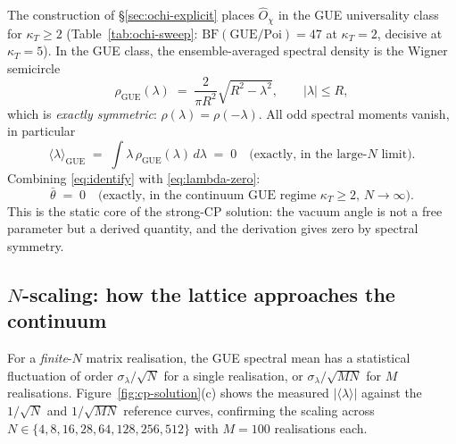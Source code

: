\documentclass[11pt,a4paper]{article}
\newcommand{\Opchi}{\hat{O}_\chi}
\theoremstyle{plain}
\theoremstyle{definition}
\theoremstyle{remark}
\begin{document}
{\sloppy
The construction of \S\ref{sec:ochi-explicit} places $\Opchi$ in
the GUE universality class for $\kappa_T \ge 2$
(Table~\ref{tab:ochi-sweep}: $\mathrm{BF}(\mathrm{GUE}/\mathrm{Poi})
= 47$ at $\kappa_T = 2$, decisive at $\kappa_T = 5$).  In the GUE
class, the ensemble-averaged spectral density is the Wigner
semicircle
\begin{equation}
  \rho_{\mathrm{GUE}}(\lambda)
  \;=\; \frac{2}{\pi R^2}\sqrt{R^2 - \lambda^2},
  \qquad |\lambda| \le R,
\end{equation}
which is \emph{exactly symmetric}: $\rho(\lambda) = \rho(-\lambda)$.
All odd spectral moments vanish, in particular
\begin{equation}
\label{eq:lambda-zero}
  \langle\lambda\rangle_{\mathrm{GUE}}
  \;=\; \int \lambda\,\rho_{\mathrm{GUE}}(\lambda)\,d\lambda
  \;=\; 0 \quad \text{(exactly, in the large-$N$ limit).}
\end{equation}
Combining \eqref{eq:identify} with \eqref{eq:lambda-zero}:
\begin{equation}
\label{eq:theta-zero}
  \boxed{\;\bar\theta \;=\; 0 \quad \text{(exactly, in the continuum
       GUE regime $\kappa_T \ge 2$, $N\to\infty$).}\;}
\end{equation}
This is the static core of the strong-CP solution: the vacuum angle
is not a free parameter but a derived quantity, and the derivation
gives zero by spectral symmetry.
\par}

\subsection{$N$-scaling: how the lattice approaches the continuum}
\label{ssec:n-scaling}

For a \emph{finite}-$N$ matrix realisation, the GUE spectral mean
has a statistical fluctuation of order $\sigma_\lambda/\sqrt{N}$ for
a single realisation, or $\sigma_\lambda/\sqrt{MN}$ for $M$
realisations.  Figure~\ref{fig:cp-solution}(c) shows the measured
$|\langle\lambda\rangle|$ against the $1/\sqrt{N}$ and
$1/\sqrt{MN}$ reference curves, confirming the scaling across
$N \in \{4,8,16,28,64,128,256,512\}$ with $M=100$ realisations each.
\end{document}

